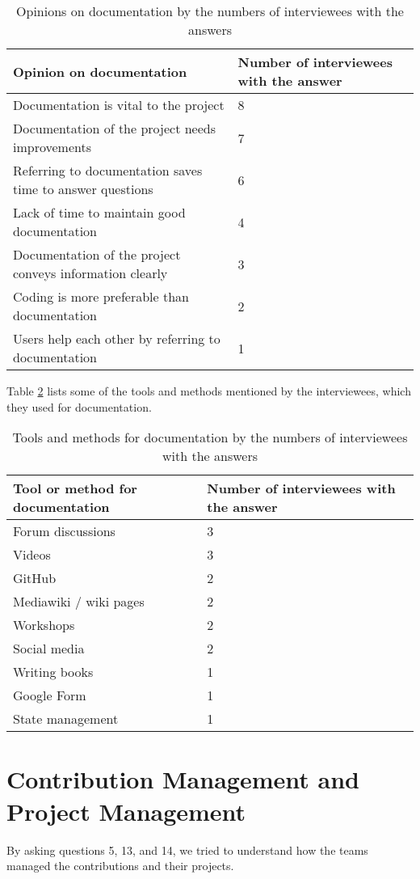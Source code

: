 \begin{table}[H]
\centering
\begin{tabular}{ll}
\hline
Opinion on documentation & Number of interviewees with the answer \\ \hline
Documentation is vital to the project& 8 \\
Documentation of the project needs improvements & 7 \\
Referring to documentation saves time to answer questions & 6 \\
Lack of time to maintain good documentation & 4 \\
Documentation of the project conveys information clearly & 3 \\
Coding is more preferable than documentation & 2 \\
Users help each other by referring to documentation & 1 \\ \hline
\end{tabular}
\caption{\label{tab_opinion_doc}Opinions on documentation by the numbers of interviewees with the answers}
\end{table}

Table \ref{tab_doc_tools} lists some of the tools and methods mentioned by the interviewees, which they used for documentation.

\begin{table}[H]
\centering
\begin{tabular}{ll}
\hline
Tool or method for documentation & Number of interviewees with the answer \\ \hline
Forum discussions & 3 \\
Videos & 3 \\
GitHub & 2 \\
Mediawiki / wiki pages & 2 \\
Workshops & 2 \\
Social media & 2 \\
Writing books & 1 \\
Google Form & 1 \\
State management & 1 \\ \hline
\end{tabular}
\caption{\label{tab_doc_tools}Tools and methods for documentation by the numbers of interviewees with the answers}
\end{table}

\section{Contribution Management and Project Management}
\label{sec_contribution_pm}
By asking questions 5, 13, and 14, we tried to understand how the teams managed the contributions and their projects.

